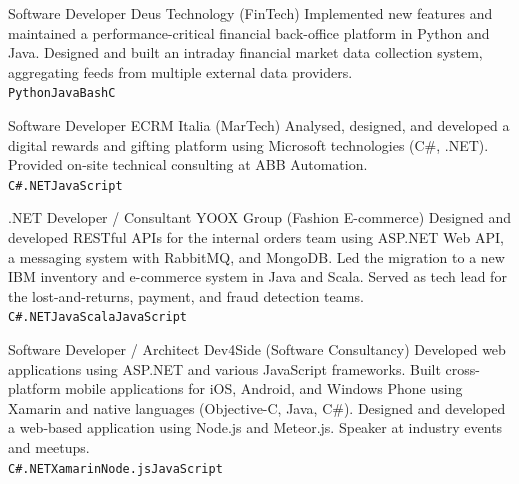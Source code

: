 \documentclass[9pt]{developercv}
\begin{document}
\begin{entrylist}
        {Software Developer}
        {Deus Technology \textnormal{(FinTech)}}
        {Implemented new features and maintained a performance-critical financial back-office platform in Python and Java. Designed and built an intraday financial market data collection system, aggregating feeds from multiple external data providers.\\
       \texttt{Python}\slashsep\texttt{Java}\slashsep\texttt{Bash}\slashsep\texttt{C}}

        {Software Developer}
        {ECRM Italia \textnormal{(MarTech)}}
        {Analysed, designed, and developed a digital rewards and gifting platform using Microsoft technologies (C\#, .NET). Provided on-site technical consulting at ABB Automation.\\
       \texttt{C\#}\slashsep\texttt{.NET}\slashsep\texttt{JavaScript}}

        {.NET Developer / Consultant}
        {YOOX Group \textnormal{(Fashion E-commerce)}}
        {Designed and developed RESTful APIs for the internal orders team using ASP.NET Web API, a messaging system with RabbitMQ, and MongoDB. Led the migration to a new IBM inventory and e-commerce system in Java and Scala. Served as tech lead for the lost-and-returns, payment, and fraud detection teams.\\
       \texttt{C\#}\slashsep\texttt{.NET}\slashsep\texttt{Java}\slashsep\texttt{Scala}\slashsep\texttt{JavaScript}}

        {Software Developer / Architect}
        {Dev4Side \textnormal{(Software Consultancy)}}
        {Developed web applications using ASP.NET and various JavaScript frameworks. Built cross-platform mobile applications for iOS, Android, and Windows Phone using Xamarin and native languages (Objective-C, Java, C\#). Designed and developed a web-based application using Node.js and Meteor.js. Speaker at industry events and meetups.\\
       \texttt{C\#}\slashsep\texttt{.NET}\slashsep\texttt{Xamarin}\slashsep\texttt{Node.js}\slashsep\texttt{JavaScript}}


\end{entrylist}
\end{document}
